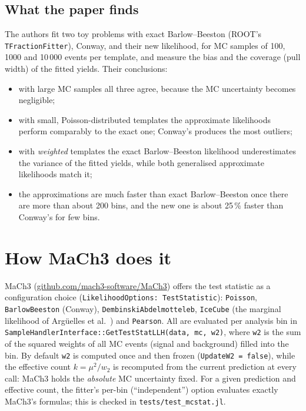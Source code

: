 \documentclass[11pt,a4paper]{article}
\newcommand{\code}[1]{\texttt{#1}}
\begin{document}
\subsection*{What the paper finds}

The authors fit two toy problems with exact Barlow--Beeston (ROOT's \code{TFractionFitter}),
Conway, and their new likelihood, for MC samples of 100, 1000 and 10\,000 events per template,
and measure the bias and the coverage (pull width) of the fitted yields. Their conclusions:
\begin{itemize}
  \item with large MC samples all three agree, because the MC uncertainty becomes negligible;
  \item with small, Poisson-distributed templates the approximate likelihoods perform comparably to
        the exact one; Conway's produces the most outliers;
  \item with \emph{weighted} templates the exact Barlow--Beeston likelihood underestimates the
        variance of the fitted yields, while both generalised approximate likelihoods match it;
  \item the approximations are much faster than exact Barlow--Beeston once there are more than
        about 200 bins, and the new one is about 25\,\% faster than Conway's for few bins.
\end{itemize}

\section{How MaCh3 does it}\label{sec:mach3}

MaCh3 (\href{https://github.com/mach3-software/MaCh3}{github.com/mach3-software/MaCh3}) offers
the test statistic as a configuration choice (\code{LikelihoodOptions: TestStatistic}):
\code{Poisson}, \code{BarlowBeeston} (Conway), \code{DembinskiAbdelmotteleb}, \code{IceCube}
(the marginal likelihood of Arg\"uelles et al.~\cite{IceCube}) and \code{Pearson}. All are
evaluated per analysis bin in \code{SampleHandlerInterface::}\allowbreak\code{GetTestStatLLH(data, mc, w2)}, where
\code{w2} is the sum of the squared weights of all MC events (signal and background) filled into
the bin. By default \code{w2} is computed once and then frozen (\code{UpdateW2 = false}), while
the effective count $k=\mu^2/w_2$ is recomputed from the current prediction at every call: MaCh3
holds the \emph{absolute} MC uncertainty fixed. For a given prediction and effective count, the
fitter's per-bin (``independent'') option evaluates exactly MaCh3's formulas; this is checked in
\code{tests/test\_mcstat.jl}.
\end{document}
